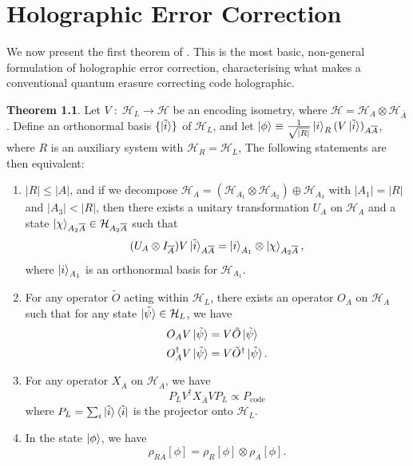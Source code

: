 \documentclass[12pt,a4paper]{report}
\numberwithin{equation}{section}
\newcommand{\ketbra}[2]{\ket{#1}\bra{#2}}
\newcommand{\ketbras}[1]{\ketbra{#1}{#1}}
\newcommand{\Pc}{P_{\text{code}}}
\newcommand{\ol}[1]{\overline{#1}}
\theoremstyle{definition}
\theoremstyle{theorem}
\newtheorem{theorem}{Theorem}[section]
\theoremstyle{theorem}
\theoremstyle{example}
\theoremstyle{definition}
\begin{document}
\chapter{Holographic Error Correction}

We now present the first theorem of \cite{Harlow}. This is the most basic, non-general formulation of holographic error correction, characterising what makes a conventional quantum erasure correcting code holographic. 
\begin{theorem}
	Let $V\;:\;\mathcal{H}_{L}\to\mathcal{H}$ be an encoding isometry, where $\mathcal{H}=\mathcal{H}_{A}\otimes\mathcal{H}_{\ol{A}}$. Define an orthonormal basis $\{\ket{\tilde{i}}\}$ of $\mathcal{H}_{L}$, and let $\ket{\phi}\equiv\frac{1}{\sqrt{|R|}}\ket{i}_{R}(V\ket{\tilde{i}})_{A\ol{A}}$, where $R$ is an auxiliary system with $\mathcal{H}_{R}=\mathcal{H}_{L}$, The following statements are then equivalent:
	\begin{enumerate}
		\item $|R|\leq|A|$, and if we decompose $\mathcal{H}_{A}=(\mathcal{H}_{A_{1}}\otimes\mathcal{H}_{A_{2}})\oplus\mathcal{H}_{A_{3}}$ with $|A_{1}|=|R|$ and $|A_{3}|<|R|$, then there exists a unitary transformation $U_{A}$ on $\mathcal{H}_{A}$ and a state $\ket{\chi}_{A_{2}\ol{A}}\in\mathcal{H}_{A_{2}\ol{A}}$ such that 
		\begin{equation}
			(U_{A}\otimes I_{\ol{A}})V\ket{\tilde{i}}_{A\ol{A}}=\ket{i}_{A_{1}}\otimes\ket{\chi}_{A_{2}\ol{A}},
		\end{equation}
		where $\ket{i}_{A_{1}}$ is an orthonormal basis for $\mathcal{H}_{A_{1}}$.
		\item For any operator $\tilde{O}$ acting within $\mathcal{H}_{L}$, there exists an operator $O_{A}$ on $\mathcal{H}_{A}$ such that for any state $\ket{\tilde{\psi}}\in\mathcal{H}_{L}$, we have
		\begin{equation}
			\begin{aligned}
				O_{A}V\ket{\tilde{\psi}}&=V\tilde{O}\ket{\tilde{\psi}}\\
				O_{A}^{\dagger}V\ket{\tilde{\psi}}&=V\tilde{O}^{\dagger}\ket{\tilde{\psi}}.
			\end{aligned}
		\end{equation}
		\item For any operator $X_{\ol{A}}$ on $\mathcal{H}_{\ol{A}}$, we have
		\begin{equation}
			P_{L} V^{\dagger}X_{\ol{A}}VP_{L}\propto\Pc
		\end{equation}
		where $P_{L}=\sum_{i}\ketbras{\tilde{i}}$ is the projector onto $\mathcal{H}_{L}$.
		\item In the state $\ket{\phi}$, we have
		\begin{equation}
			\rho_{R\ol{A}}[\phi]=\rho_{R}[\phi]\otimes\rho_{\ol{A}}[\phi].
		\end{equation}
	\end{enumerate}
\end{theorem}
\end{document}

